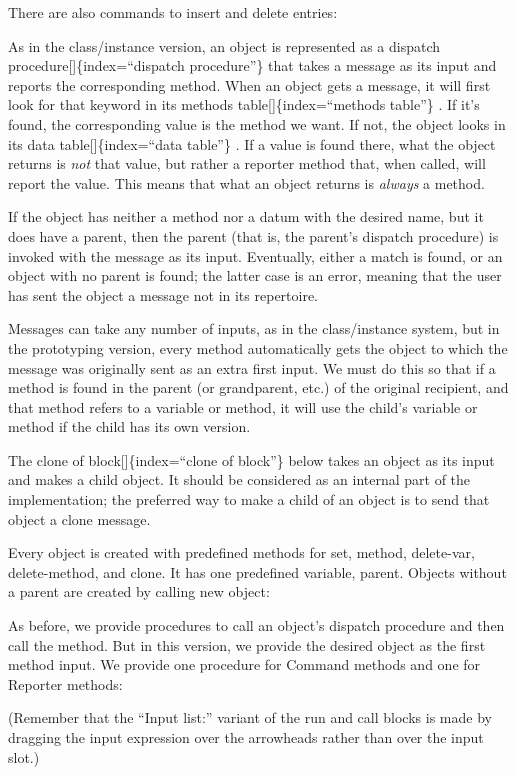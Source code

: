 \documentclass[
  letterpaper,
]{book}
\begin{document}
There are also commands to insert and delete entries:

As in the class/instance version, an object is represented as a dispatch
procedure{[}{]}\{index=``dispatch procedure''\} that takes a message as
its input and reports the corresponding method. When an object gets a
message, it will ﬁrst look for that keyword in its methods
table{[}{]}\{index=``methods table''\} . If it's found, the
corresponding value is the method we want. If not, the object looks in
its data table{[}{]}\{index=``data table''\} . If a value is found
there, what the object returns is \emph{not} that value, but rather a
reporter method that, when called, will report the value. This means
that what an object returns is \emph{always} a method.

If the object has neither a method nor a datum with the desired name,
but it does have a parent, then the parent (that is, the parent's
dispatch procedure) is invoked with the message as its input.
Eventually, either a match is found, or an object with no parent is
found; the latter case is an error, meaning that the user has sent the
object a message not in its repertoire.

Messages can take any number of inputs, as in the class/instance system,
but in the prototyping version, every method automatically gets the
object to which the message was originally sent as an extra ﬁrst input.
We must do this so that if a method is found in the parent (or
grandparent, etc.) of the original recipient, and that method refers to
a variable or method, it will use the child's variable or method if the
child has its own version.

The clone of block{[}{]}\{index=``clone of block''\} below takes an
object as its input and makes a child object. It should be considered as
an internal part of the implementation; the preferred way to make a
child of an object is to send that object a clone message.

Every object is created with predefined methods for set, method,
delete-var, delete-method, and clone. It has one predefined variable,
parent. Objects without a parent are created by calling new object:

As before, we provide procedures to call an object's dispatch procedure
and then call the method. But in this version, we provide the desired
object as the ﬁrst method input. We provide one procedure for Command
methods and one for Reporter methods:

(Remember that the ``Input list:'' variant of the run and call blocks is
made by dragging the input expression over the arrowheads rather than
over the input slot.)
\end{document}
